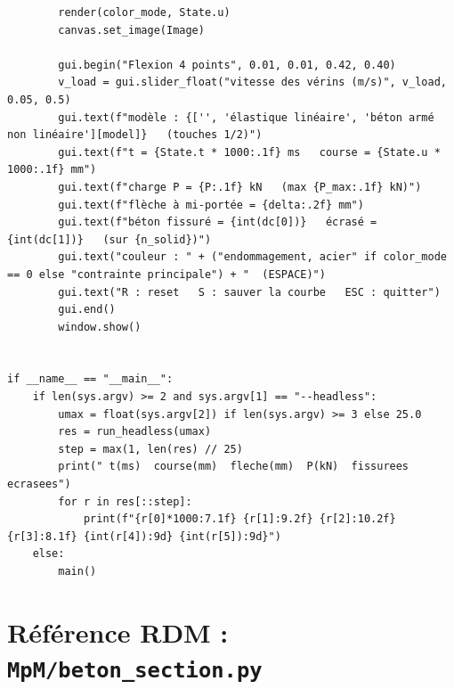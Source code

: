 \documentclass[11pt,a4paper]{article}
\begin{document}
\begin{lstlisting}
        render(color_mode, State.u)
        canvas.set_image(Image)

        gui.begin("Flexion 4 points", 0.01, 0.01, 0.42, 0.40)
        v_load = gui.slider_float("vitesse des vérins (m/s)", v_load, 0.05, 0.5)
        gui.text(f"modèle : {['', 'élastique linéaire', 'béton armé non linéaire'][model]}   (touches 1/2)")
        gui.text(f"t = {State.t * 1000:.1f} ms   course = {State.u * 1000:.1f} mm")
        gui.text(f"charge P = {P:.1f} kN   (max {P_max:.1f} kN)")
        gui.text(f"flèche à mi-portée = {delta:.2f} mm")
        gui.text(f"béton fissuré = {int(dc[0])}   écrasé = {int(dc[1])}   (sur {n_solid})")
        gui.text("couleur : " + ("endommagement, acier" if color_mode == 0 else "contrainte principale") + "  (ESPACE)")
        gui.text("R : reset   S : sauver la courbe   ESC : quitter")
        gui.end()
        window.show()


if __name__ == "__main__":
    if len(sys.argv) >= 2 and sys.argv[1] == "--headless":
        umax = float(sys.argv[2]) if len(sys.argv) >= 3 else 25.0
        res = run_headless(umax)
        step = max(1, len(res) // 25)
        print(" t(ms)  course(mm)  fleche(mm)  P(kN)  fissurees  ecrasees")
        for r in res[::step]:
            print(f"{r[0]*1000:7.1f} {r[1]:9.2f} {r[2]:10.2f} {r[3]:8.1f} {int(r[4]):9d} {int(r[5]):9d}")
    else:
        main()
\end{lstlisting}

\section{Référence RDM : \texttt{MpM/beton\_section.py}}
\end{document}
